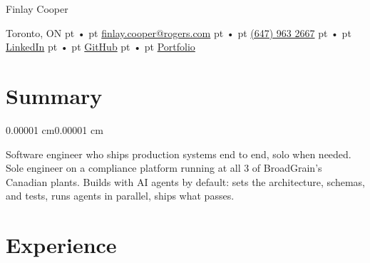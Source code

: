 \documentclass[letterpaper]{article}
\newenvironment{onecolentry}{
    \begin{adjustwidth}{0.00001 cm}{0.00001 cm}
}{
    \end{adjustwidth}
}
\newenvironment{header}{
    \setlength{\topsep}{0pt}\par\kern\topsep\centering\linespread{1.3}
}{
    \par\kern\topsep
}
\begin{document}
    \newcommand{\AND}{\unskip
        \cleaders\copy\ANDbox\hskip\wd\ANDbox
        \ignorespaces}
    \newsavebox\ANDbox
    \sbox\ANDbox{\textbar}

    \begin{header}
        \fontsize{20 pt}{20 pt}\selectfont Finlay Cooper

        \vspace{3 pt}

        \normalsize
        \centering
        Toronto, ON  pt •  pt
        \href{mailto:finlay.cooper@rogers.com}{finlay.cooper@rogers.com}  pt •  pt
        \href{tel:+1-647-963-2667}{(647) 963 2667}  pt •  pt
        \href{https://www.linkedin.com/in/finlaycooper/}{LinkedIn}  pt •  pt
        \href{https://github.com/FinlayCooper}{GitHub}  pt •  pt
        \href{https://finlaycooper.ca}{Portfolio}
    \end{header}

    \newcommand{\stack}[1]{~$|$~ \mbox{\small #1}}
    \newcommand{\sep}{~$\cdot$~}
    \newcommand{\role}[2]{\begin{onecolentry}\mbox{#1}\hfill #2\end{onecolentry}}

    \section{Summary}

    \begin{onecolentry}
        Software engineer who ships production systems end to end, solo when needed. Sole engineer on a compliance platform running at all 3 of BroadGrain's Canadian plants. Builds with AI agents by default: sets the architecture, schemas, and tests, runs agents in parallel, ships what passes.
    \end{onecolentry}

    \section{Experience}
\end{document}
